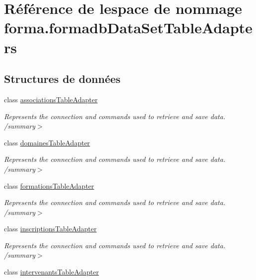 \hypertarget{namespaceforma_1_1formadb_data_set_table_adapters}{}\section{Référence de l\textquotesingle{}espace de nommage forma.\+formadb\+Data\+Set\+Table\+Adapters}
\label{namespaceforma_1_1formadb_data_set_table_adapters}
\subsection*{Structures de données}
\begin{DoxyCompactItemize}
\item 
class \hyperlink{classforma_1_1formadb_data_set_table_adapters_1_1associations_table_adapter}{associations\+Table\+Adapter}
\begin{DoxyCompactList}\small\item\em Represents the connection and commands used to retrieve and save data. /summary$>$ \end{DoxyCompactList}\item 
class \hyperlink{classforma_1_1formadb_data_set_table_adapters_1_1domaines_table_adapter}{domaines\+Table\+Adapter}
\begin{DoxyCompactList}\small\item\em Represents the connection and commands used to retrieve and save data. /summary$>$ \end{DoxyCompactList}\item 
class \hyperlink{classforma_1_1formadb_data_set_table_adapters_1_1formations_table_adapter}{formations\+Table\+Adapter}
\begin{DoxyCompactList}\small\item\em Represents the connection and commands used to retrieve and save data. /summary$>$ \end{DoxyCompactList}\item 
class \hyperlink{classforma_1_1formadb_data_set_table_adapters_1_1inscriptions_table_adapter}{inscriptions\+Table\+Adapter}
\begin{DoxyCompactList}\small\item\em Represents the connection and commands used to retrieve and save data. /summary$>$ \end{DoxyCompactList}\item 
class \hyperlink{classforma_1_1formadb_data_set_table_adapters_1_1intervenants_table_adapter}{intervenants\+Table\+Adapter}

\end{DoxyCompactItemize}

